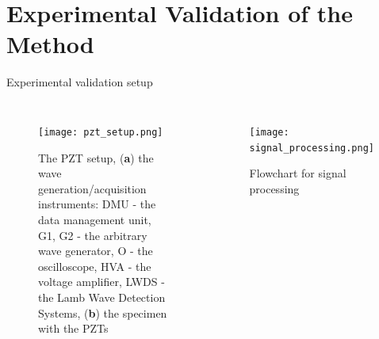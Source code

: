 \documentclass[10pt]{beamer} %
\begin{document}
	\section{Experimental Validation of the Method }

	\begin{frame}[label=frame12]{Experimental validation setup}

		\begin{columns}[T]


			\begin{figure}

				\texttt{[image: pzt\_setup.png]}

				\caption{The PZT setup, (\textbf{a}) the wave generation/acquisition	instruments: DMU - the data management unit, G1, G2 - the arbitrary wave generator, O - the oscilloscope, HVA - the voltage amplifier, LWDS - the Lamb Wave Detection Systems, (\textbf{b}) the specimen with the PZTs}

				\label{fig:pzt_setup}

			\end{figure}


			\begin{figure}

				\texttt{[image: signal\_processing.png]}

				\caption{Flowchart for signal processing}			\label{fig:signal_processing}

			\end{figure}

		\end{columns}

		
	\end{frame}
\end{document}
